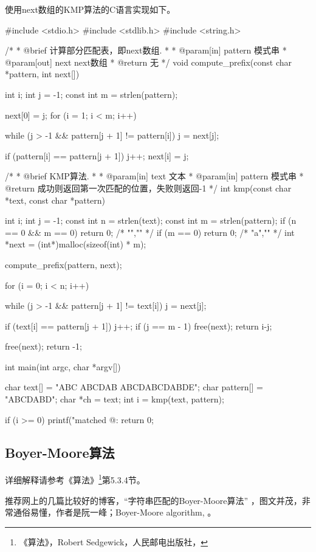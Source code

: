 使用next数组的KMP算法的C语言实现如下。
\begin{Codex}[label=kmp.c]
#include <stdio.h>
#include <stdlib.h>
#include <string.h>

/*
 * @brief 计算部分匹配表，即next数组.
 *
 * @param[in] pattern 模式串
 * @param[out] next next数组
 * @return 无
 */
void compute_prefix(const char *pattern, int next[]) {
    int i;
    int j = -1;
    const int m = strlen(pattern);

    next[0] = j;
    for (i = 1; i < m; i++) {
        while (j > -1 && pattern[j + 1] != pattern[i]) j = next[j];

        if (pattern[i] == pattern[j + 1]) j++;
        next[i] = j;
    }
}

/*
 * @brief KMP算法.
 *
 * @param[in] text 文本
 * @param[in] pattern 模式串
 * @return 成功则返回第一次匹配的位置，失败则返回-1
 */
int kmp(const char *text, const char *pattern) {
    int i;
    int j = -1;
    const int n = strlen(text);
    const int m = strlen(pattern);
    if (n == 0 && m == 0) return 0; /* "","" */
    if (m == 0) return 0;  /* "a","" */
    int *next = (int*)malloc(sizeof(int) * m);

    compute_prefix(pattern, next);

    for (i = 0; i < n; i++) {
        while (j > -1 && pattern[j + 1] != text[i]) j = next[j];

        if (text[i] == pattern[j + 1]) j++;
        if (j == m - 1) {
            free(next);
            return i-j;
        }
    }

    free(next);
    return -1;
}


int main(int argc, char *argv[]) {
    char text[] = "ABC ABCDAB ABCDABCDABDE";
    char pattern[] = "ABCDABD";
    char *ch = text;
    int i = kmp(text, pattern);

    if (i >= 0) printf("matched @: %
    return 0;
}
\end{Codex}


\subsection{Boyer-Moore算法}
详细解释请参考《算法》\footnote{《算法》，Robert 
Sedgewick，人民邮电出版社，}第5.3.4节。

推荐网上的几篇比较好的博客，“字符串匹配的Boyer-Moore算法” 
，图文并茂，非常通俗易懂，作者是阮一峰；Boyer-Moore
 algorithm, 。

